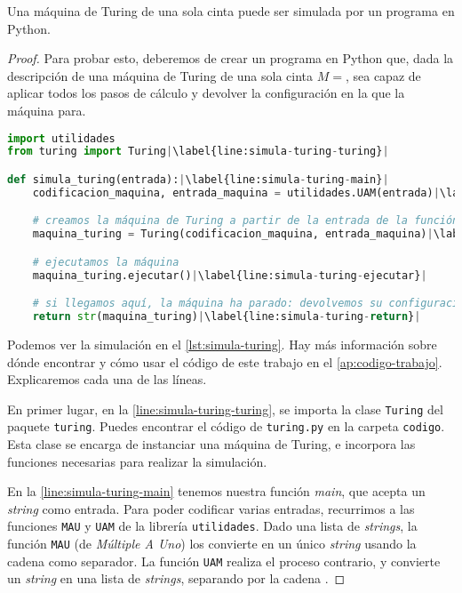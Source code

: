 \begin{proposicion}\label{prop:python-a-monocinta}
Una máquina de Turing de una sola cinta puede ser simulada por un programa en Python.
\end{proposicion}
\begin{proof}
Para probar esto, deberemos de crear un programa en Python que, dada la descripción de una máquina de Turing de una sola cinta $M=$, sea capaz de aplicar todos los pasos de cálculo y devolver la configuración en la que la máquina para.
\vspace{8pt}
\begin{lstlisting}[language=Python, caption=\lstinline{simula_turing.py},label={lst:simula-turing}]
import utilidades
from turing import Turing|\label{line:simula-turing-turing}|

def simula_turing(entrada):|\label{line:simula-turing-main}|
    codificacion_maquina, entrada_maquina = utilidades.UAM(entrada)|\label{line:simula-turing-uam}|

    # creamos la máquina de Turing a partir de la entrada de la función SISO
    maquina_turing = Turing(codificacion_maquina, entrada_maquina)|\label{line:simula-turing-codificamaq}|

    # ejecutamos la máquina
    maquina_turing.ejecutar()|\label{line:simula-turing-ejecutar}|

    # si llegamos aquí, la máquina ha parado: devolvemos su configuración
    return str(maquina_turing)|\label{line:simula-turing-return}|
\end{lstlisting}

Podemos ver la simulación en el \cref{lst:simula-turing}. Hay más información sobre dónde encontrar y cómo usar el código de este trabajo en el \cref{ap:codigo-trabajo}. Explicaremos cada una de las líneas.

En primer lugar, en la \cref{line:simula-turing-turing}, se importa la clase \lstinline{Turing} del paquete \lstinline{turing}. Puedes encontrar el código de \texttt{turing.py} en la carpeta \texttt{codigo}. Esta clase se encarga de instanciar una máquina de Turing, e incorpora las funciones necesarias para realizar la simulación.

En la \cref{line:simula-turing-main} tenemos nuestra función \emph{main}, que acepta un \emph{string} como entrada. Para poder codificar varias entradas, recurrimos a las funciones \texttt{MAU} y \texttt{UAM} de la librería \texttt{utilidades}. Dado una lista de \emph{strings}, la función \texttt{MAU} (de \emph{Múltiple A Uno}) los convierte en un único \emph{string} usando la cadena \palabra{::} como separador. La función \texttt{UAM} realiza el proceso contrario, y convierte un \emph{string} en una lista de \emph{strings}, separando por la cadena \palabra{::}.


\end{proof}

